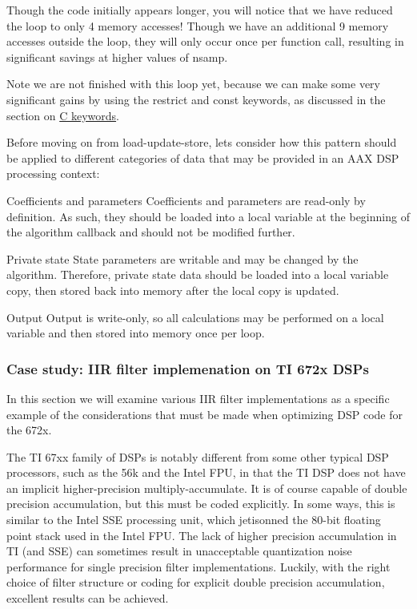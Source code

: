 Though the code initially appears longer, you will notice that we have reduced the loop to only 4 memory accesses! Though we have an additional 9 memory accesses outside the loop, they will only occur once per function call, resulting in significant savings at higher values of {\ttfamily nsamp}.

\begin{DoxyNote}{Note}
we are not finished with this loop yet, because we can make some very significant gains by using the {\ttfamily restrict} and {\ttfamily const} keywords, as discussed in the section on \hyperlink{a00362_subsection__c_keywords}{C keywords}.
\end{DoxyNote}
Before moving on from load-\/update-\/store, let\textquotesingle{}s consider how this pattern should be applied to different categories of data that may be provided in an A\+A\+X D\+S\+P processing context\+:


\begin{DoxyItemize}
\item Coefficients and parameters  Coefficients and parameters are read-\/only by definition. As such, they should be loaded into a local variable at the beginning of the algorithm callback and should not be modified further.  


\item Private state  State parameters are writable and may be changed by the algorithm. Therefore, private state data should be loaded into a local variable copy, then stored back into memory after the local copy is updated.  


\item Output  Output is write-\/only, so all calculations may be performed on a local variable and then stored into memory once per loop.  


\end{DoxyItemize}

\hypertarget{a00362_subsection__case_study_iir_filter_implemenation_on_ti_672x_dsps}{}\subsubsection{Case study\+: I\+I\+R filter implemenation on T\+I 672x D\+S\+Ps}\label{a00362_subsection__case_study_iir_filter_implemenation_on_ti_672x_dsps}
 In this section we will examine various I\+I\+R filter implementations as a specific example of the considerations that must be made when optimizing D\+S\+P code for the 672x.

The T\+I 67xx family of D\+S\+Ps is notably different from some other typical D\+S\+P processors, such as the 56k and the Intel F\+P\+U, in that the T\+I D\+S\+P does not have an implicit higher-\/precision multiply-\/accumulate. It is of course capable of double precision accumulation, but this must be coded explicitly. In some ways, this is similar to the Intel S\+S\+E processing unit, which jetisonned the 80-\/bit floating point stack used in the Intel F\+P\+U. The lack of higher precision accumulation in T\+I (and S\+S\+E) can sometimes result in unacceptable quantization noise performance for single precision filter implementations. Luckily, with the right choice of filter structure or coding for explicit double precision accumulation, excellent results can be achieved.

